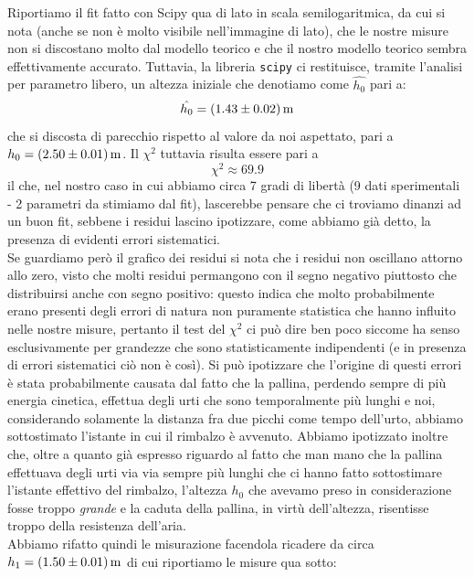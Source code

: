 \documentclass{article}
\begin{document}
Riportiamo il fit fatto con Scipy qua di lato in scala semilogaritmica, da cui si nota (anche se non è molto visibile nell'immagine di lato), che le nostre misure non si discostano molto dal modello teorico e che il nostro modello teorico sembra effettivamente accurato. Tuttavia, la libreria \texttt{scipy} ci restituisce, tramite l'analisi per parametro libero, un altezza iniziale che denotiamo come $\hat{h_0}$ pari a:
\begin{equation}
	\hat{h_0} = (1.43 \pm 0.02) \, \text{\unit{m}}
\end{equation}
che si discosta di parecchio rispetto al valore da noi aspettato, pari a $h_0 = (2.50 \pm 0.01) \, \text{\unit{m}}$. Il $\chi^2$ tuttavia risulta essere pari a
\begin{equation}
	\chi^2 \approx 69.9
\end{equation}
il che, nel nostro caso in cui abbiamo circa 7 gradi di libertà (9 dati sperimentali - 2 parametri da stimiamo dal fit), lascerebbe pensare che ci troviamo dinanzi ad un buon fit, sebbene i residui lascino ipotizzare, come abbiamo già detto, la presenza di evidenti errori sistematici. \\
Se guardiamo però il grafico dei residui si nota che i residui non oscillano attorno allo zero, visto che molti residui permangono con il segno negativo piuttosto che distribuirsi anche con segno positivo: questo indica che molto probabilmente erano presenti degli errori di natura non puramente statistica che hanno influito nelle nostre misure, pertanto il test del $\chi^2$ ci può dire ben poco siccome ha senso esclusivamente per grandezze che sono statisticamente indipendenti (e in presenza di errori sistematici ciò non è così). Si può ipotizzare che l'origine di questi errori è stata probabilmente causata dal fatto che la pallina, perdendo sempre di più energia cinetica, effettua degli urti che sono temporalmente più lunghi e noi, considerando solamente la distanza fra due picchi come tempo dell'urto, abbiamo sottostimato l'istante in cui il rimbalzo è avvenuto.
Abbiamo ipotizzato inoltre che, oltre a quanto già espresso riguardo al fatto che man mano che la pallina effettuava degli urti via via sempre più lunghi che ci hanno fatto sottostimare l'istante effettivo del rimbalzo, l'altezza $h_0$ che avevamo preso in considerazione fosse troppo \emph{grande} e la caduta della pallina, in virtù dell'altezza, risentisse troppo della resistenza dell'aria. \\
Abbiamo rifatto quindi le misurazione facendola ricadere da circa $h_1 = (1.50 \pm 0.01) \, \text{\unit{m}}$ di cui riportiamo le misure qua sotto: 
\end{document}
